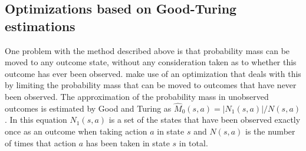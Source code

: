 \subsection{Optimizations based on Good-Turing estimations}
\label{sec:mbie_gt}

One problem with the method described above is that probability mass can be
moved to any outcome state, without any consideration taken as to whether this
outcome has ever been observed. \textcite{dietterich2013pac} make
use of an optimization that deals with this by limiting the probability mass
that can be moved to outcomes that have never been observed. The approximation
of the probability mass in unobserved outcomes is estimated by Good and Turing
as $\hat{M}_0(s,a) = |N_1(s,a)| / N(s,a)$ \parencite{gtpaper}. In this
equation $N_1(s,a)$ is a set of the states that have been observed exactly
once as an outcome when taking action $a$ in state $s$ and $N(s,a)$ is the
number of times that action $a$ has been taken in state $s$ in total.
